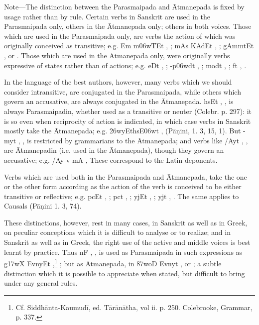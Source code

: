 \begin{note}
  Note—The distinction between the Parasmaipada and Ātmanepada is fixed
  by usage rather than by rule. Certain verbs in Sanskrit are used in
  the Parasmaipada only, others in the Ātmanepada only; others in both
  voices. Those which are used in the Parasmaipada only, are verbs the
  action of which was originally conceived as transitive; e.g. {\dn {}Em\2
  m\306wTEt} , ; {\dn mA\2s\2
  KAdEt} , ; {\dn g\5AmmtEt}
  ,  or .
  Those which are used in the Ātmanepada only, were originally verbs
  expressive of states rather than of actions; e.g. {\dn eDt\?}
  , ; {\dn -p\306wdt\?} , ; {\dn modt\?} , ; {\dn f\?t\?}
  , .

  In the language of the best authors, however, many verbs which we
  should consider intransitive, are conjugated in the Parasmaipada,
  while others which govern an accusative, are always conjugated in the
  Ātmanepada. {\dn hsEt} , , is always
  Parasmaipadin, whether used as a transitive or neuter (Colebr. p.
  297): it is so even when reciprocity of action is indicated, in which
  case verbs in Sanskrit mostly take the Ātmanepada; e.g. {\dn \326wyEthsE\306wt}
  ,  (Pāṇini, 1. 3, 15,
  1). But {\dn -myt\?} , , is restricted by
  grammarians to the Ātmanepada; and verbs like {\dn /Ayt\?} ,
  , are Ātmanepadin (i.e. used in the Ātmanepada),
  though they govern an accusative; e.g. {\dn /Ay-v mA\2} ,  These correspond to the Latin deponents.

  Verbs which are used both in the Parasmaipada and Ātmanepada, take the
  one or the other form according as the action of the verb is conceived
  to be either transitive or reflective; e.g. {\dn pcEt} ,
  ; {\dn pct\?} , ;
  {\dn yjEt} , ; {\dn yjt\?} ,
  . The same applies to Causals (Pāṇini
  1. 3, 74).

  These distinctions, however, rest in many cases, in Sanskrit as well
  as in Greek, on peculiar conceptions which it is difficult to analyse
  or to realize; and in Sanskrit as well as in Greek, the right use of
  the active and middle voices is best learnt by practice. Thus {\dn nF}
  , , is used as Parasmaipada in such expressions as
  {\dn g\317wX\2 EvnyEt} ,\footnote{Cf.
    Siddhānta-Kaumudī, ed. Tārānātha, vol ii. p. 250. Colebrooke,
    Grammar, p. 337.} ; but as
  Ātmanepada, in {\dn \387woD\2 Evnyt\?} ,  or ; a subtle distinction which it
  is possible to appreciate when stated, but difficult to bring under
  any general rules.


\end{note}
